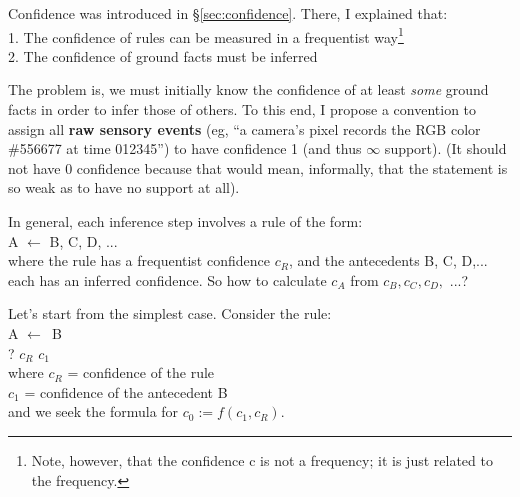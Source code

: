 \documentclass[a4paper]{report}
\begin{document}
Confidence was introduced in \S\ref{sec:confidence}.  There, I explained that:\\
1. The confidence of rules can be measured in a frequentist way\footnote{Note, however, that the confidence c is not a frequency; it is just related to the frequency. }\\
2. The confidence of ground facts must be inferred

The problem is, we must initially know the confidence of at least \textit{some} ground facts in order to infer those of others.  To this end, I propose a convention to assign all \textbf{raw sensory events} (eg, ``a camera's pixel records the RGB color \#556677 at time 012345'')  to have confidence 1 (and thus $\infty$ support).  (It should not have 0 confidence because that would mean, informally, that the statement is so weak as to have no support at all).

In general, each inference step involves a rule of the form:\\
\hspace*{1cm} A $\longleftarrow$ B, C, D, ...\\
where the rule has a frequentist confidence $c_R$, and the antecedents B, C, D,... each has an inferred confidence.  So how to calculate $c_A$ from $c_B, c_C, c_D,$ ...?

Let's start from the simplest case.  Consider the rule:\\
\hspace*{1cm} A $\leftarrow$\textemdash\textemdash\textemdash\textemdash\textemdash $\,$ B\\
\hspace*{1cm} ? \hspace*{0.8cm} $c_R$ \hspace*{0.7cm} $c_1$ \\
where \hspace*{0.4cm} $c_R$ = confidence of the rule\\
\hspace*{1.6cm} $c_1$ = confidence of the antecedent B\\
and we seek the formula for $c_0 := f(c_1, c_R)$.
\end{document}

